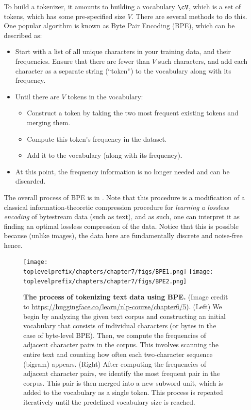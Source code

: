 \documentclass[../../book-main.tex]{subfiles}
\begin{document}
To build a tokenizer, it amounts to building a vocabulary \(\cV\), which is a set of tokens, which has some pre-specified size \(V\). There are several methods to do this. One popular algorithm is known as Byte Pair Encoding (BPE), which can be described as:
\begin{itemize}
    \item Start with a list of all unique characters in your training data, and their frequencies. Ensure that there are fewer than \(V\) such characters, and add each character as a separate string (``token'') to the vocabulary along with its frequency.
    \item Until there are \(V\) tokens in the vocabulary:
    \begin{itemize}
        \item Construct a token by taking the two most frequent existing tokens and merging them.
        \item Compute this token's frequency in the dataset.
        \item Add it to the vocabulary (along with its frequency).
    \end{itemize} 
    \item At this point, the frequency information is no longer needed and can be discarded.
\end{itemize}
The overall process of BPE is in . Note that this procedure is a modification of a classical information-theoretic compression procedure for \textit{learning a lossless encoding} of bytestream data (such as text), and as such, one can interpret it as finding an optimal lossless compression of the data. Notice that this is possible because (unlike images), the data here are fundamentally discrete and noise-free hence.
\begin{figure}
    \centering
    \texttt{[image: \\toplevelprefix/chapters/chapter7/figs/BPE1.png]}\hspace{0.6in} 
    \texttt{[image: \\toplevelprefix/chapters/chapter7/figs/BPE2.png]} 
    \caption{\small {\bf The process of tokenizing text data using BPE.} (Image credit to \url{https://huggingface.co/learn/nlp-course/chapter6/5}). (Left) We begin by analyzing the given text corpus and constructing an initial vocabulary that consists of individual characters (or bytes in the case of byte-level BPE). Then, we compute the frequencies of adjacent character pairs in the corpus. This involves scanning the entire text and counting how often each two-character sequence (bigram) appears. (Right) After computing the frequencies of adjacent character pairs, we identify the most frequent pair in the corpus. This pair is then merged into a new subword unit, which is added to the vocabulary as a single token. This process is repeated iteratively until the predefined vocabulary size is reached. }
    \label{fig:BPE}
\end{figure}
\end{document}

